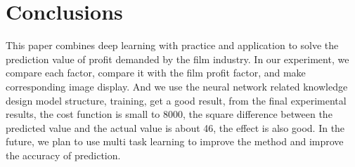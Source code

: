 \section{Conclusions}

This paper combines deep learning with practice and application to solve the prediction value of profit demanded by the film industry. In our experiment, we compare each factor, compare it with the film profit factor, and make corresponding image display. And we use the neural network related knowledge design model structure, training, get a good result, from the final experimental results, the cost function is small to 8000, the square difference between the predicted value and the actual value is about 46, the effect is also good. In the future, we plan to use multi task learning to improve the method and improve the accuracy of prediction.
